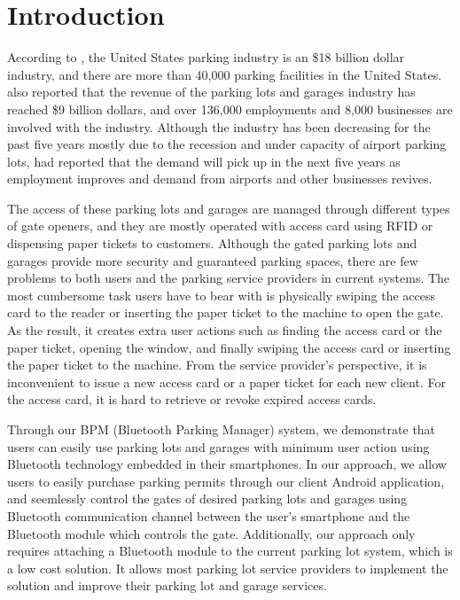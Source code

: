 \section{Introduction}

According to \cite{national}, the United States parking industry is an \$18 billion dollar industry, and there are more than 40,000 parking facilities in the United States. \cite{ibisworld} also reported that the revenue of the parking lots and garages industry has reached \$9 billion dollars, and over 136,000 employments and 8,000 businesses are involved with the industry. Although the industry has been decreasing for the past five years mostly due to the recession and under capacity of airport parking lots, \cite{ibisworld} had reported that the demand will pick up in the next five years as employment improves and demand from airports and other businesses revives. 

The access of these parking lots and garages are managed through different types of gate openers, and they are mostly operated with access card using RFID or dispensing paper tickets to customers. Although the gated parking lots and garages provide more security and guaranteed parking spaces, there are few problems to both users and the parking service providers in current systems. The most cumbersome task users have to bear with is physically swiping the access card to the reader or inserting the paper ticket to the machine to open the gate. As the result, it creates extra user actions such as finding the access card or the paper ticket, opening the window, and finally swiping the access card or inserting the paper ticket to the machine. From the service provider's perspective, it is inconvenient to issue a new access card or a paper ticket for each new client. For the access card, it is hard to retrieve or revoke expired access cards.

Through our BPM (Bluetooth Parking Manager) system, we demonstrate that users can easily use parking lots and garages with minimum user action using Bluetooth technology embedded in their smartphones. In our approach, we allow users to easily purchase parking permits through our client Android application, and seemlessly control the gates of desired parking lots and garages using Bluetooth communication channel between the user's smartphone and the Bluetooth module which controls the gate. Additionally, our approach only requires attaching a Bluetooth module to the current parking lot system, which is a low cost solution. It allows most parking lot service providers to implement the solution and improve their parking lot and garage services.